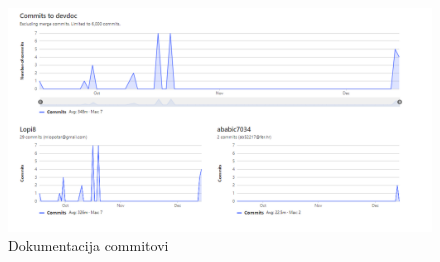 		\begin{figure}[H]
			\includegraphics[scale=0.50]{slike/devdoc.png} %
			\centering
			\caption{Dokumentacija commitovi}
			\label{DOCS}
		\end{figure}
	
		\eject 
	
